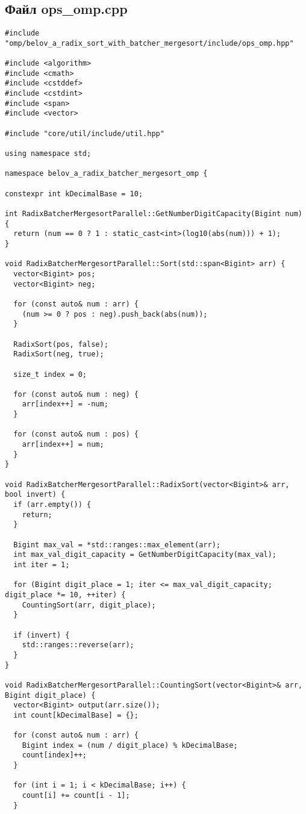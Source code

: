 \documentclass[a4paper,12pt]{article}
\begin{document}
\subsection*{Файл ops\_omp.cpp}
\begin{lstlisting}
#include "omp/belov_a_radix_sort_with_batcher_mergesort/include/ops_omp.hpp"

#include <algorithm>
#include <cmath>
#include <cstddef>
#include <cstdint>
#include <span>
#include <vector>

#include "core/util/include/util.hpp"

using namespace std;

namespace belov_a_radix_batcher_mergesort_omp {

constexpr int kDecimalBase = 10;

int RadixBatcherMergesortParallel::GetNumberDigitCapacity(Bigint num) {
  return (num == 0 ? 1 : static_cast<int>(log10(abs(num))) + 1);
}

void RadixBatcherMergesortParallel::Sort(std::span<Bigint> arr) {
  vector<Bigint> pos;
  vector<Bigint> neg;

  for (const auto& num : arr) {
    (num >= 0 ? pos : neg).push_back(abs(num));
  }

  RadixSort(pos, false);
  RadixSort(neg, true);

  size_t index = 0;

  for (const auto& num : neg) {
    arr[index++] = -num;
  }

  for (const auto& num : pos) {
    arr[index++] = num;
  }
}

void RadixBatcherMergesortParallel::RadixSort(vector<Bigint>& arr, bool invert) {
  if (arr.empty()) {
    return;
  }

  Bigint max_val = *std::ranges::max_element(arr);
  int max_val_digit_capacity = GetNumberDigitCapacity(max_val);
  int iter = 1;

  for (Bigint digit_place = 1; iter <= max_val_digit_capacity; digit_place *= 10, ++iter) {
    CountingSort(arr, digit_place);
  }

  if (invert) {
    std::ranges::reverse(arr);
  }
}

void RadixBatcherMergesortParallel::CountingSort(vector<Bigint>& arr, Bigint digit_place) {
  vector<Bigint> output(arr.size());
  int count[kDecimalBase] = {};

  for (const auto& num : arr) {
    Bigint index = (num / digit_place) % kDecimalBase;
    count[index]++;
  }

  for (int i = 1; i < kDecimalBase; i++) {
    count[i] += count[i - 1];
  }


\end{lstlisting}
\end{document}
